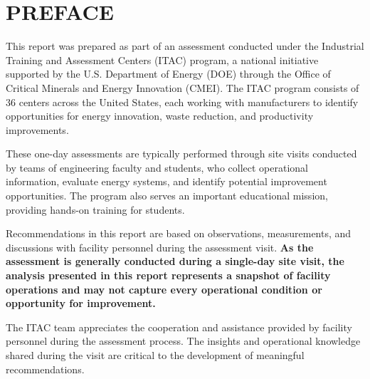 \documentclass[letterpaper,11pt,amsart,table,x11names]{article}
\begin{document}







\date{}

\thispagestyle{empty}


\newpage
{}
\setcounter{page}{1} 
\setcounter{equation}{0} \setcounter{figure}{0}

\pagestyle{fancy}

\section*{PREFACE}
This report was prepared as part of an assessment conducted under the Industrial Training and Assessment Centers (ITAC) program, a national initiative supported by the U.S. Department of Energy (DOE) through the Office of Critical Minerals and Energy Innovation (CMEI). The ITAC program consists of 36 centers across the United States, each working with manufacturers to identify opportunities for energy innovation, waste reduction, and productivity improvements.

These one-day assessments are typically performed through site visits conducted by teams of engineering faculty and students, who collect operational information, evaluate energy systems, and identify potential improvement opportunities. The program also serves an important educational mission, providing hands-on training for students.

Recommendations in this report are based on observations, measurements, and discussions with facility personnel during the assessment visit. \textbf{As the assessment is generally conducted during a single-day site visit, the analysis presented in this report represents a snapshot of facility operations and may not capture every operational condition or opportunity for improvement.}

The ITAC team appreciates the cooperation and assistance provided by facility personnel during the assessment process. The insights and operational knowledge shared during the visit are critical to the development of meaningful recommendations.
\end{document}
